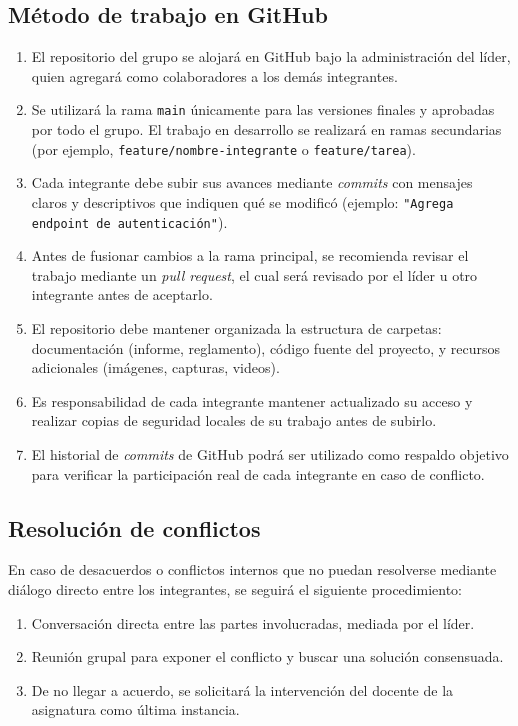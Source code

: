 \subsection{Método de trabajo en GitHub}

\begin{enumerate}[label=\arabic*.]
    \item El repositorio del grupo se alojará en GitHub bajo la administración del líder, quien agregará como colaboradores a los demás integrantes.
    \item Se utilizará la rama \texttt{main} únicamente para las versiones finales y aprobadas por todo el grupo. El trabajo en desarrollo se realizará en ramas secundarias (por ejemplo, \texttt{feature/nombre-integrante} o \texttt{feature/tarea}).
    \item Cada integrante debe subir sus avances mediante \textit{commits} con mensajes claros y descriptivos que indiquen qué se modificó (ejemplo: \texttt{"Agrega endpoint de autenticación"}).
    \item Antes de fusionar cambios a la rama principal, se recomienda revisar el trabajo mediante un \textit{pull request}, el cual será revisado por el líder u otro integrante antes de aceptarlo.
    \item El repositorio debe mantener organizada la estructura de carpetas: documentación (informe, reglamento), código fuente del proyecto, y recursos adicionales (imágenes, capturas, videos).
    \item Es responsabilidad de cada integrante mantener actualizado su acceso y realizar copias de seguridad locales de su trabajo antes de subirlo.
    \item El historial de \textit{commits} de GitHub podrá ser utilizado como respaldo objetivo para verificar la participación real de cada integrante en caso de conflicto.
\end{enumerate}

\subsection{Resolución de conflictos}

En caso de desacuerdos o conflictos internos que no puedan resolverse mediante diálogo directo entre los integrantes, se seguirá el siguiente procedimiento:

\begin{enumerate}[label=\arabic*.]
    \item Conversación directa entre las partes involucradas, mediada por el líder.
    \item Reunión grupal para exponer el conflicto y buscar una solución consensuada.
    \item De no llegar a acuerdo, se solicitará la intervención del docente de la asignatura como última instancia.
\end{enumerate}
